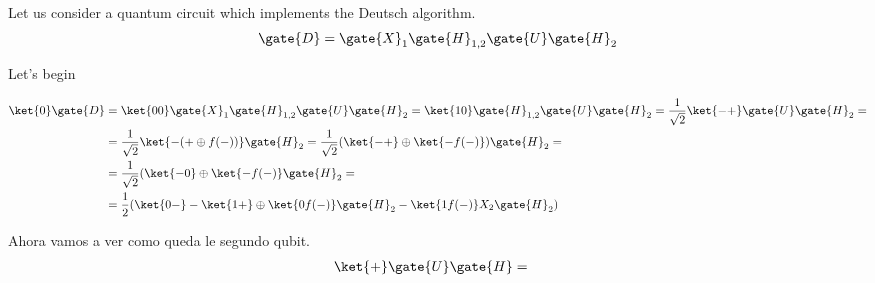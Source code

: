 Let us consider a quantum circuit which implements the Deutsch algorithm.
\[
	\gate{D}=\gate{X}_1\gate{H}_{1,2}\gate{U}\gate{H}_2
\]

Let's begin

\begin{equation}
	\label{eq:deutchs-circuit}
	\begin{split}
		\ket{0}\gate{D}&=\ket{00}\gate{X}_1\gate{H}_{1,2}\gate{U}\gate{H}_2=\ket{10}\gate{H}_{1,2}\gate{U}\gate{H}_2=\frac{1}{\sqrt{2}}\ket{-+}\gate{U}\gate{H}_2=\\
		&=\frac{1}{\sqrt{2}}\ket{-(+\oplus f(-))}\gate{H}_2=\frac{1}{\sqrt{2}}(\ket{-+}\oplus\ket{- f(-)})\gate{H}_2=\\
		&=\frac{1}{\sqrt{2}}(\ket{-0}\oplus\ket{- f(-)}\gate{H}_2=\\
		&=\frac{1}{2}(\ket{0-}-\ket{1+}\oplus\ket{0 f(-)}\gate{H}_2-\ket{1 f(-)}X_2\gate{H}_2)
	\end{split}
\end{equation}

Ahora vamos a ver como queda le segundo qubit.
\begin{equation*}
	\begin{split}
		\ket{+}\gate{U}\gate{H}&=
	\end{split}
\end{equation*}
